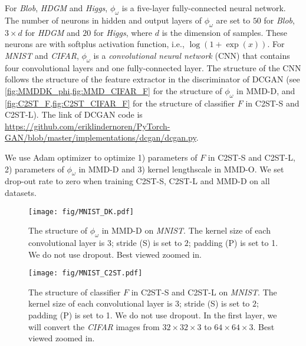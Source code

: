 \documentclass{article}
\begin{document}
For \emph{Blob}, \emph{HDGM} and \emph{Higgs}, $\phi_\omega$ is a five-layer fully-connected neural network. The number of neurons in hidden and output layers of $\phi_\omega$ are set to $50$ for \emph{Blob}, $3\times d$ for \emph{HDGM} and $20$ for \emph{Higgs}, where $d$ is the dimension of samples. These neurons are with softplus activation function, i.e., $\log(1+\exp(x))$. For \emph{MNIST} and \emph{CIFAR}, $\phi_\omega$ is a \emph{convolutional neural network} (CNN) that contains four convolutional layers and one fully-connected layer. The structure of the CNN follows the structure of the feature extractor in the discriminator of DCGAN \citep{DCGAN_Radford} (see \cref{fig:MMDDK_phi,fig:MMD_CIFAR_F} for the structure of $\phi_\omega$ in MMD-D, and \cref{fig:C2ST_F,fig:C2ST_CIFAR_F} for the structure of classifier $F$ in C2ST-S and C2ST-L). The link of DCGAN code is \url{https://github.com/eriklindernoren/PyTorch-GAN/blob/master/implementations/dcgan/dcgan.py}.

We use Adam optimizer \citep{Adam:optimizer} to optimize 1) parameters of $F$ in C2ST-S and C2ST-L, 2) parameters of $\phi_\omega$ in MMD-D and 3) kernel lengthscale in MMD-O. We set drop-out rate to zero when training C2ST-S, C2ST-L and MMD-D on all datasets.

\begin{figure}[!t]
    \begin{center}
        \texttt{[image: fig/MNIST\_DK.pdf]}
        \caption{The structure of $\phi_\omega$ in MMD-D on \emph{MNIST}. The kernel size of each convolutional layer is $3$; stride (S) is set to $2$; padding (P) is set to 1. We do not use dropout. Best viewed zoomed in.}\label{fig:MMDDK_phi}
    \end{center}
\end{figure}


\begin{figure}[!t]
    \begin{center}
        \texttt{[image: fig/MNIST\_C2ST.pdf]}
        \caption{The structure of classifier $F$ in C2ST-S and C2ST-L on \emph{MNIST}. The kernel size of each convolutional layer is $3$; stride (S) is set to $2$; padding (P) is set to 1. We do not use dropout. In the first layer, we will convert the \emph{CIFAR} images from $32\times 32\times 3$ to $64\times 64\times 3$. Best viewed zoomed in.}    \label{fig:C2ST_F}
    \end{center}
\end{figure}
\end{document}
